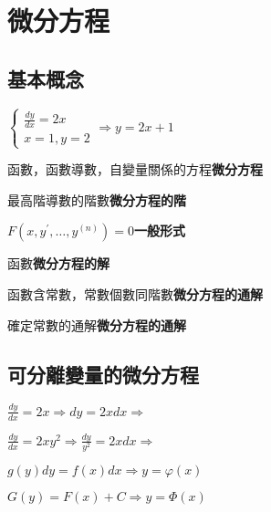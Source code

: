 \documentclass[UTF8]{ctexart}
\newcommand{\ma}[1]{\begin{array}{llll} #1 \end{array}}
\begin{document}





\setcounter{section}{6}

\newpage


\section{微分方程}
\subsection{基本概念}
$
\left\{
    \begin{array}{ll}
        \frac{dy}{dx}=2x\\
        x=1,y=2
    \end{array}
\right.\Rightarrow  y=2x+1
$\par
函數，函數導數，自變量關係的方程\textbf{微分方程}\par
最高階導數的階數\textbf{微分方程的階}\par
$F\left(x,y^{'},\dots,y^{\left( n \right)  } \right)=0  $\textbf{一般形式}\par
函數\textbf{微分方程的解}\par
函數含常數，常數個數同階數\textbf{微分方程的通解}\par
確定常數的通解\textbf{微分方程的通解}
\subsection{可分離變量的微分方程}
$\frac{dy}{dx}=2x\Rightarrow dy=2x dx \Rightarrow $\par
$\frac{dy}{dx}=2xy^2\Rightarrow \frac{dy}{y^2}=2xdx\Rightarrow$\par
$g\left( y \right)dy=f\left( x \right)dx \Rightarrow y=\varphi \left( x \right)$\par
$G\left( y \right)=F\left( x \right)+C \Rightarrow y=\varPhi  \left( x \right)$
\end{document}
